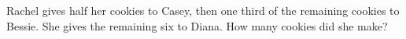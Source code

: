 Rachel gives half her cookies to Casey, then one third of the remaining cookies to Bessie. She gives the remaining six to Diana. How many cookies did she make?
